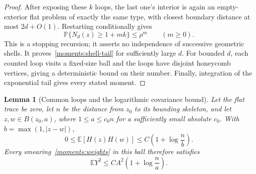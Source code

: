 \documentclass[11pt]{article}
\newtheorem{lemma}[theorem]{Lemma}
\theoremstyle{definition}
\theoremstyle{remark}
\numberwithin{equation}{section}
\begin{document}
\begin{proof}
After exposing these $k$ loops, the last one's interior is again an
empty-exterior flat problem of exactly the same type, with closest
boundary distance at most $2d+O(1)$.  Restarting conditionally gives
\[
 \mathbb P\{N_d(z)\geq1+mk\}\leq\rho^m\qquad(m\geq0).
\]
This is a stopping recursion; it asserts no independence of successive
geometric shells.  It proves~\eqref{moments:shell-tail} for sufficiently
large $d$.  For bounded $d$, each counted loop visits a fixed-size ball
and the loops have disjoint honeycomb vertices, giving a deterministic
bound on their number.  Finally, integration of the exponential tail
gives every stated moment.
\end{proof}

\begin{lemma}[Common loops and the logarithmic covariance bound]
\label{moments:covariance}
Let the flat trace be zero, let $n$ be the distance from $z_0$ to its
bounding skeleton, and let $z,w\in B(z_0,a)$, where
$1\leq a\leq c_0n$ for a sufficiently small absolute $c_0$.  With
$b=\max(1,|z-w|)$,
\begin{equation}\label{moments:covariance-bound}
 0\leq\mathbb E[H(z)H(w)]
 \leq C\left(1+\log\frac{n}{b}\right).
\end{equation}
Every smearing~\eqref{moments:weights} in this ball therefore satisfies
\begin{equation}\label{moments:second-moment}
 \mathbb E Y^2\leq C A^2\left(1+\log\frac{n}{a}\right).
\end{equation}
\end{lemma}
\end{document}
